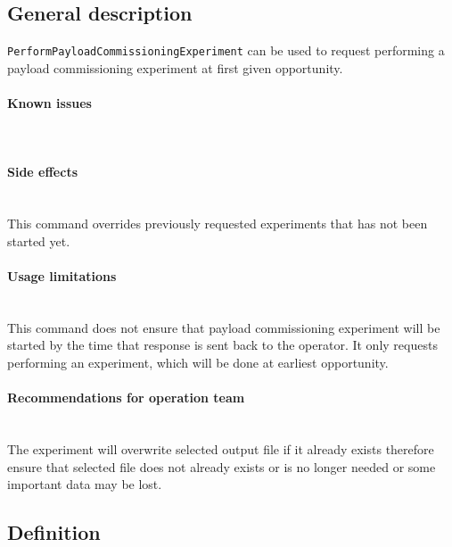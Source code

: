 
\subsection{General description}
\texttt{PerformPayloadCommissioningExperiment} can be used to request performing a payload 
commissioning experiment at first given opportunity. 

\paragraph{Known issues} \mbox{} \\
\None

\paragraph{Side effects} \mbox{} \\
This command overrides previously requested experiments that has not been started yet. 

\paragraph{Usage limitations} \mbox{} \\
This command does not ensure that payload commissioning experiment will be started 
by the time that response is sent back to the operator. It only requests performing 
an experiment, which will be done at earliest opportunity.

\paragraph{Recommendations for operation team} \mbox{} \\
The experiment will overwrite selected output file if it already exists therefore ensure 
that selected file does not already exists or is no longer needed or some important data
may be lost.

\subsection{Definition}

\begin{tcarglist}
\end{tcarglist}

